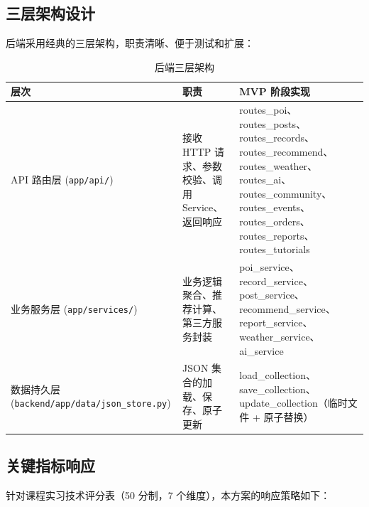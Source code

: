 \subsection{三层架构设计}

后端采用经典的三层架构，职责清晰、便于测试和扩展：

\begin{table}[H]
  \centering
  \caption{后端三层架构}
  \label{tab:backend-layers}
  \begin{tabularx}{\textwidth}{p{3cm}|p{6cm}|p{5cm}}
    \toprule
    \textbf{层次} & \textbf{职责} & \textbf{MVP 阶段实现} \\
    \midrule
    API 路由层 (\texttt{app/api/}) & 接收 HTTP 请求、参数校验、调用 Service、返回响应 & routes\_poi、routes\_posts、routes\_records、routes\_recommend、routes\_weather、routes\_ai、routes\_community、routes\_events、routes\_orders、routes\_reports、routes\_tutorials \\
    \hline
    业务服务层 (\texttt{app/services/}) & 业务逻辑聚合、推荐计算、第三方服务封装 & poi\_service、record\_service、post\_service、recommend\_service、report\_service、weather\_service、ai\_service \\
    \hline
    数据持久层 (\texttt{backend/app/data/json\_store.py}) & JSON 集合的加载、保存、原子更新 & load\_collection、save\_collection、update\_collection（临时文件 + 原子替换） \\
    \bottomrule
  \end{tabularx}
\end{table}

\subsection{关键指标响应}

针对课程实习技术评分表（50 分制，7 个维度），本方案的响应策略如下：

